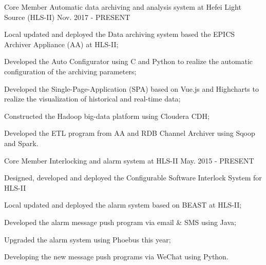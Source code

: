

\begin{cventries}

  \cventry
    {Core Member} %
    {Automatic data archiving and analysis system at Hefei Light Source (HLS-II)} %
    {} %
    {Nov. 2017 - PRESENT} %
    {
      \begin{cvitems} %
        \item {Local updated and deployed the Data archiving system based the EPICS Archiver Appliance (AA) at HLS-II;}
        \item {Developed the Auto Configurator using C and Python to realize the automatic configuration of the archiving parameters;}
        \item {Developed the Single-Page-Application (SPA) based on Vue.js and Highcharts to realize the visualization of historical and real-time data;}
        \item {Constructed the Hadoop big-data platform using Cloudera CDH;}
        \item {Developed the ETL program from AA and RDB Channel Archiver using Sqoop and Spark.}
      \end{cvitems}
    }

  \cventry
    {Core Member} %
    {Interlocking and alarm system at HLS-II} %
    {} %
    {May. 2015 - PRESENT} %
    {
      \begin{cvitems} %
        \item {Designed, developed and deployed the Configurable Software Interlock System for HLS-II}
        \item {Local updated and deployed the alarm system based on BEAST at HLS-II;}
        \item {Developed the alarm message push program via email \& SMS using Java;}
        \item {Upgraded the alarm system using Phoebus this year;}
        \item {Developing the new message push programs via WeChat using Python.}
      \end{cvitems}
    }


\end{cventries}
